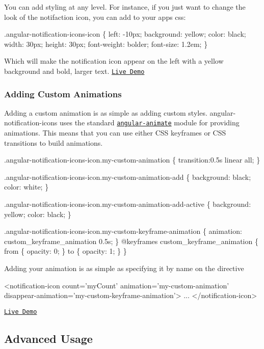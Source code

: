 You can add styling at any level. For instance, if you just want to change the look of the notifaction icon, you can add to your app\textquotesingle{}s css\+:


\begin{DoxyCode}
.angular-notification-icons-icon \{
  left: -10px;
  background: yellow;
  color: black;
  width: 30px;
  height: 30px;
  font-weight: bolder;
  font-size: 1.2em;
\}
\end{DoxyCode}
 Which will make the notification icon appear on the left with a yellow background and bold, larger text. \href{http://jemonjam.com/angular-notification-icons#custom-style}{\tt Live Demo}

\subsubsection*{Adding Custom Animations}

Adding a custom animation is as simple as adding custom styles. angular-\/notification-\/icons uses the standard \href{https://docs.angularjs.org/guide/animations}{\tt angular-\/animate} module for providing animations. This means that you can use either C\+SS keyframes or C\+SS transitions to build animations.


\begin{DoxyCode}
.angular-notification-icons-icon.my-custom-animation \{
  transition:0.5s linear all;
\}

.angular-notification-icons-icon.my-custom-animation-add \{
  background: black;
  color: white;
\}

.angular-notification-icons-icon.my-custom-animation-add-active \{
  background: yellow;
  color: black;
\}

.angular-notification-icons-icon.my-custom-keyframe-animation \{
    animation: custom\_keyframe\_animation 0.5s;
\}
@keyframes custom\_keyframe\_animation \{
  from \{
    opacity: 0;
  \}
  to \{
    opacity: 1;
  \}
\}
\end{DoxyCode}


Adding your animation is as simple as specifying it by name on the directive 
\begin{DoxyCode}
<notification-icon count='myCount' animation='my-custom-animation'
       disappear-animation='my-custom-keyframe-animation'>
    ...
</notification-icon>
\end{DoxyCode}
 \href{http://jemonjam.com/angular-notification-icons#custom-style}{\tt Live Demo}

\subsection*{Advanced Usage}

